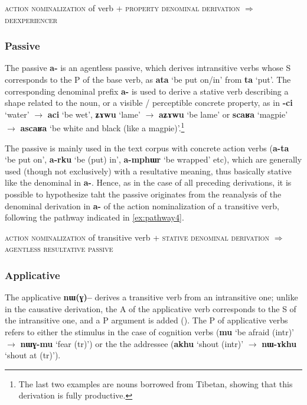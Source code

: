 \documentclass[oldfontcommands,oneside,a4paper,11pt]{article}
\newcommand{\ipa}[1]{\mbox{\phon\textbf{#1}}} %
\begin{document}
\begin{exe}
\ex \label{ex:pathway3}
\glt \textsc{action nominalization} of verb + \textsc{property denominal derivation} $\Rightarrow$ \textsc{deexperiencer}
\end{exe}
\subsubsection{Passive} \label{sec:passive}
The passive \ipa{a-} is an agentless passive, which derives intransitive verbs whose S corresponds to the P of the base verb, as \ipa{ata}  `be put on/in' from \ipa{ta} `put'. The corresponding denominal prefix \ipa{a-} is used to derive a stative verb describing a shape related to the noun, or a visible / perceptible concrete property, as in \ipa{-ci} `water' $\rightarrow$  \ipa{aci} `be wet',  \ipa{ʑɤwu} `lame' $\rightarrow$  \ipa{aʑɤwu} `be lame' 
or \ipa{scaʁa} `magpie' $\rightarrow$  \ipa{ascaʁa} `be white and black (like a magpie)'.\footnote{The last two examples are nouns borrowed from Tibetan, showing that this derivation is fully productive.} 

The passive is mainly used in the text corpus with concrete action verbs (\ipa{a-ta} `be put on', \ipa{a-rku} `be (put) in', \ipa{a-mphɯr} `be wrapped' etc),  which are generally used (though not exclusively) with a resultative meaning, thus basically stative like the denominal in \ipa{a-}. Hence, as in the case of all preceding derivations, it is possible to hypothesize taht the passive originates from the reanalysis of the denominal derivation in \ipa{a-} of  the action nominalization of a transitive verb, following the pathway indicated in \ref{ex:pathway4}.


\begin{exe}
\ex \label{ex:pathway4}
\glt \textsc{action nominalization} of transitive verb + \textsc{stative denominal derivation} $\Rightarrow$ \textsc{agentless resultative passive}
\end{exe}

\subsubsection{Applicative} \label{sec:appl}
The applicative \ipa{nɯ(ɣ)--} derives a transitive verb from an intransitive one; unlike in the causative derivation, the A of the applicative verb corresponds to the S of the intransitive one, and a P argument is added (\citealt{jacques13tropative}). The P of applicative verbs refers to either the stimulus in the case of cognition verbs (\ipa{mu} `be afraid (intr)' $\rightarrow$ \ipa{nɯɣ-mu} `fear (tr)') or the the addressee (\ipa{akhu} `shout (intr)'  $\rightarrow$ \ipa{nɯ-ɤkhu} `shout at (tr)'). 
\end{document}
